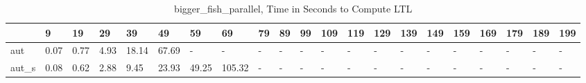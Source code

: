\begin{table}
\centering
\caption{bigger_fish_parallel, Time in Seconds to Compute LTL}
\label{bigger_fish_parallel_LTL_time}
\begin{tabular}{lllllllllllllllllllll}
\toprule
{} &     9 &    19 &    29 &     39 &     49 &     59 &      69 & 79 & 89 & 99 & 109 & 119 & 129 & 139 & 149 & 159 & 169 & 179 & 189 & 199 \\
\midrule
aut   &  0.07 &  0.77 &  4.93 &  18.14 &  67.69 &      - &       - &  - &  - &  - &   - &   - &   - &   - &   - &   - &   - &   - &   - &   - \\
aut\_s &  0.08 &  0.62 &  2.88 &   9.45 &  23.93 &  49.25 &  105.32 &  - &  - &  - &   - &   - &   - &   - &   - &   - &   - &   - &   - &   - \\
\bottomrule
\end{tabular}
\end{table}
